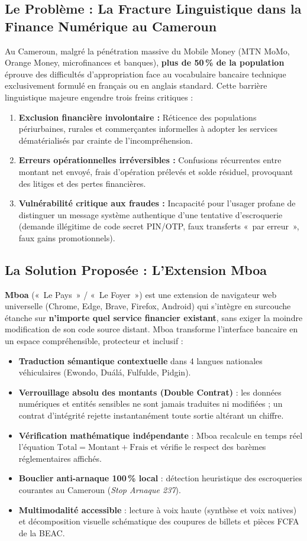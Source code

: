 \documentclass[10pt,a4paper]{article}
\begin{document}
\subsection{Le Problème : La Fracture Linguistique dans la Finance Numérique au Cameroun}
Au Cameroun, malgré la pénétration massive du Mobile Money (MTN MoMo, Orange Money, microfinances et banques), \textbf{plus de 50\,\% de la population} éprouve des difficultés d'appropriation face au vocabulaire bancaire technique exclusivement formulé en français ou en anglais standard. Cette barrière linguistique majeure engendre trois freins critiques :
\begin{enumerate}
  \item \textbf{Exclusion financière involontaire :} Réticence des populations périurbaines, rurales et commerçantes informelles à adopter les services dématérialisés par crainte de l'incompréhension.
  \item \textbf{Erreurs opérationnelles irréversibles :} Confusions récurrentes entre montant net envoyé, frais d'opération prélevés et solde résiduel, provoquant des litiges et des pertes financières.
  \item \textbf{Vulnérabilité critique aux fraudes :} Incapacité pour l'usager profane de distinguer un message système authentique d'une tentative d'escroquerie (demande illégitime de code secret PIN/OTP, faux transferts «~par erreur~», faux gains promotionnels).
\end{enumerate}

\subsection{La Solution Proposée : L'Extension Mboa}
\textbf{Mboa} («~Le Pays~» / «~Le Foyer~») est une extension de navigateur web universelle (Chrome, Edge, Brave, Firefox, Android) qui s'intègre en surcouche étanche sur \textbf{n'importe quel service financier existant}, sans exiger la moindre modification de son code source distant. Mboa transforme l'interface bancaire en un espace compréhensible, protecteur et inclusif :
\begin{itemize}
  \item \textbf{Traduction sémantique contextuelle} dans 4 langues nationales véhiculaires (Ewondo, Duálá, Fulfulde, Pidgin).
  \item \textbf{Verrouillage absolu des montants (Double Contrat)} : les données numériques et entités sensibles ne sont jamais traduites ni modifiées ; un contrat d'intégrité rejette instantanément toute sortie altérant un chiffre.
  \item \textbf{Vérification mathématique indépendante} : Mboa recalcule en temps réel l'équation $\text{Total} = \text{Montant} + \text{Frais}$ et vérifie le respect des barèmes réglementaires affichés.
  \item \textbf{Bouclier anti-arnaque 100\,\% local} : détection heuristique des escroqueries courantes au Cameroun (\textit{Stop Arnaque 237}).
  \item \textbf{Multimodalité accessible} : lecture à voix haute (synthèse et voix natives) et décomposition visuelle schématique des coupures de billets et pièces FCFA de la BEAC.
\end{itemize}
\end{document}

